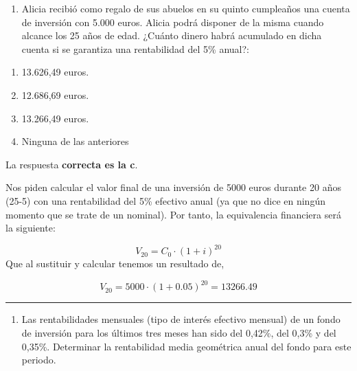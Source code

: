 \documentclass[
  letterpaper,
  DIV=11,
  numbers=noendperiod]{scrreprt}
\providecommand{\tightlist}{%
  \setlength{\itemsep}{0pt}\setlength{\parskip}{0pt}}\usepackage{longtable,booktabs,array}
\begin{document}
\begin{enumerate}
\def\labelenumi{\arabic{enumi}.}
\setcounter{enumi}{63}
\tightlist
\item
  Alicia recibió como regalo de sus abuelos en su quinto cumpleaños una
  cuenta de inversión con 5.000 euros. Alicia podrá disponer de la misma
  cuando alcance los 25 años de edad. ¿Cuánto dinero habrá acumulado en
  dicha cuenta si se garantiza una rentabilidad del 5\% anual?:
\end{enumerate}

\begin{enumerate}
\def\labelenumi{\alph{enumi}.}
\item
  13.626,49 euros.
\item
  12.686,69 euros.
\item
  13.266,49 euros.
\item
  Ninguna de las anteriores
\end{enumerate}

\begin{tcolorbox}[enhanced jigsaw, left=2mm, opacityback=0, colback=white, breakable, arc=.35mm, bottomrule=.15mm, rightrule=.15mm, toprule=.15mm, leftrule=.75mm, colframe=quarto-callout-tip-color-frame]
\begin{minipage}[t]{5.5mm}
\textcolor{quarto-callout-tip-color}{\faLightbulb}
\end{minipage}%
\begin{minipage}[t]{\textwidth - 5.5mm}

La respuesta \textbf{correcta es la c}.

Nos piden calcular el valor final de una inversión de 5000 euros durante
20 años (25-5) con una rentabilidad del 5\% efectivo anual (ya que no
dice en ningún momento que se trate de un nominal). Por tanto, la
equivalencia financiera será la siguiente:

\[V_{20}=C_0\cdot\left(1+i\right)^{20}\] Que al sustituir y calcular
tenemos un resultado de,

\[V_{20}=5000\cdot\left(1+0.05\right)^{20}=13266.49\]

\end{minipage}%
\end{tcolorbox}

\begin{center}\rule{0.5\linewidth}{0.5pt}\end{center}

\begin{enumerate}
\def\labelenumi{\arabic{enumi}.}
\setcounter{enumi}{64}
\tightlist
\item
  Las rentabilidades mensuales (tipo de interés efectivo mensual) de un
  fondo de inversión para los últimos tres meses han sido del 0,42\%,
  del 0,3\% y del 0,35\%. Determinar la rentabilidad media geométrica
  anual del fondo para este periodo.
\end{enumerate}
\end{document}
